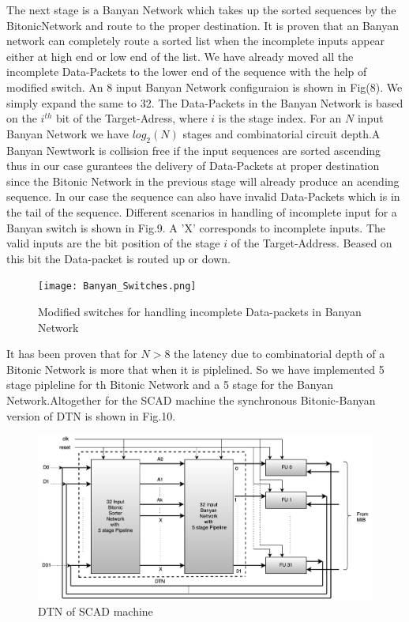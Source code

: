 \documentclass[adraft]{eptcs}
\begin{document}
					      The next stage is a Banyan Network which takes up the sorted sequences by the BitonicNetwork and route to the proper destination. It is proven \cite{batcher_banyan_ref} that 
					      an Banyan network can completely route a sorted list when the incomplete inputs appear either at high end or low end of the list. We have already moved all the incomplete Data-Packets
					      to the lower end of the sequence with the help of modified switch. An 8 input Banyan Network configuraion is shown in Fig(8). We simply expand the same to 32.
					      The Data-Packets in the Banyan Network is based on the $i^{th}$ bit of the Target-Adress, where $i$ is the stage index. For an $N$ input Banyan Network we have $log_{2}(N)$ 
					      stages and combinatorial circuit depth.A Banyan Newtwork is collision free if the input sequences are sorted ascending
					      thus in our case gurantees the delivery of Data-Packets at proper destination since the Bitonic Network in the previous stage will already produce an acending sequence. In our case 
					      the sequence can also have invalid Data-Packets which is in the tail of the sequence. Different scenarios in handling of incomplete input for a Banyan switch is shown in Fig.9. A 'X'
					      corresponds to incomplete inputs. The valid inputs are the bit position of the stage $i$ of the Target-Address. Beased on this bit the Data-packet is routed up or down.
					      \begin{figure}[!ht]
						      \texttt{[image: Banyan\_Switches.png]}
						      \caption{Modified switches for handling incomplete Data-packets in Banyan Network }
					      \end{figure}
					      It has been proven \cite{sorting_network_on_fpgas} that for $N > 8$ the latency
					      due to combinatorial depth of a Bitonic Network is more that when it is piplelined. So we have implemented 5 stage pipleline for th Bitonic Network and a 5 stage for 
					      the Banyan Network.Altogether for the SCAD machine the synchronous Bitonic-Banyan version of DTN is shown in Fig.10.
					      \begin{figure}[!ht]
						      \includegraphics[width=\linewidth]{Batcher_Banyan_Combined.png}
						      \caption{DTN of SCAD machine}
					      \end{figure}
\end{document}
